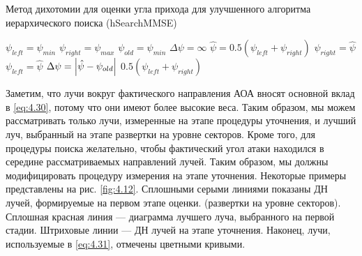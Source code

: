 \begin{algorithm}
    \caption{Метод дихотомии для оценки угла прихода для улучшенного алгоритма иерархического поиска (hSearchMMSE)}
    \label{lst:4.1}
    \begin{algorithmic}
        \State $\psi_{left} = \psi_{min}$
        \State $\psi_{right} = \psi_{max}$
        \State $\psi_{old} = \psi_{min}$
        \State $\Delta \psi = \infty$
        \While{$\Delta \psi > \epsilon$}
        \State $\hat \psi = 0.5 (\psi_{left} + \psi_{right})$
        \State $\psi_{right} = \hat\psi$
        \Else
        \State $\psi_{left} = \hat\psi$
        \EndIf
        \State $\Delta \psi = \abs{\hat \psi - \psi_{old}}$
        \EndWhile
        \State \Return $0.5(\psi_{left} + \psi_{right})$
    \end{algorithmic}
\end{algorithm}

Заметим, что лучи вокруг фактического направления АОА вносят основной
вклад в \eqref{eq:4.30}, потому что они имеют более высокие веса. Таким образом, мы можем
рассматривать только лучи, измеренные на этапе процедуры уточнения, и лучший
луч, выбранный на этапе развертки на уровне секторов. Кроме того, для процедуры
поиска желательно, чтобы фактический угол атаки находился в середине
рассматриваемых направлений лучей. Таким образом, мы должны модифицировать
процедуру измерения на этапе уточнения. Некоторые примеры представлены на рис.
\ref{fig:4.12}.
Сплошными серыми линиями показаны ДН лучей, формируемые на первом этапе оценки.
(развертки на уровне секторов). Сплошная красная линия — диаграмма лучшего луча,
выбранного на первой стадии. Штриховые линии — ДН лучей на этапе
уточнения. Наконец, лучи, используемые в \eqref{eq:4.31}, отмечены цветными кривыми.

